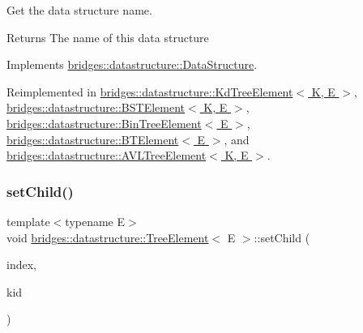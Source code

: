 Get the data structure name. 

\begin{DoxyReturn}{Returns}
The name of this data structure 
\end{DoxyReturn}


Implements \hyperlink{classbridges_1_1datastructure_1_1_data_structure_a4ff66cb34409f11fe9fc647f6d8a22ce}{bridges\+::datastructure\+::\+Data\+Structure}.



Reimplemented in \hyperlink{classbridges_1_1datastructure_1_1_kd_tree_element_a76f6d9bfadfdec09d0a8564aa0e33235}{bridges\+::datastructure\+::\+Kd\+Tree\+Element$<$ K, E $>$}, \hyperlink{classbridges_1_1datastructure_1_1_b_s_t_element_a2bb8cc9ec4b6bc5b89ecef0f17be366f}{bridges\+::datastructure\+::\+B\+S\+T\+Element$<$ K, E $>$}, \hyperlink{classbridges_1_1datastructure_1_1_bin_tree_element_aef86e3663785972251547e409fdc757b}{bridges\+::datastructure\+::\+Bin\+Tree\+Element$<$ E $>$}, \hyperlink{classbridges_1_1datastructure_1_1_b_t_element_a2118b6b74f3fe0fec39e3b258a7dee89}{bridges\+::datastructure\+::\+B\+T\+Element$<$ E $>$}, and \hyperlink{classbridges_1_1datastructure_1_1_a_v_l_tree_element_ab04d1e9ad4630e408041e8137dc9854a}{bridges\+::datastructure\+::\+A\+V\+L\+Tree\+Element$<$ K, E $>$}.

\mbox{\label{classbridges_1_1datastructure_1_1_tree_element_ad894ec5edfa66ddf59dd83a8712b48f1}} 
\subsubsection{\texorpdfstring{set\+Child()}{setChild()}}
{\footnotesize\ttfamily template$<$typename E$>$ \\
void \hyperlink{classbridges_1_1datastructure_1_1_tree_element}{bridges\+::datastructure\+::\+Tree\+Element}$<$ E $>$\+::set\+Child (\begin{DoxyParamCaption}\item[{const size\+\_\+t \&}]{index,  }\item[{\hyperlink{classbridges_1_1datastructure_1_1_tree_element}{Tree\+Element}$<$ E $>$ $\ast$}]{kid }\end{DoxyParamCaption})\hspace{0.3cm}{\ttfamily [inline]}}



